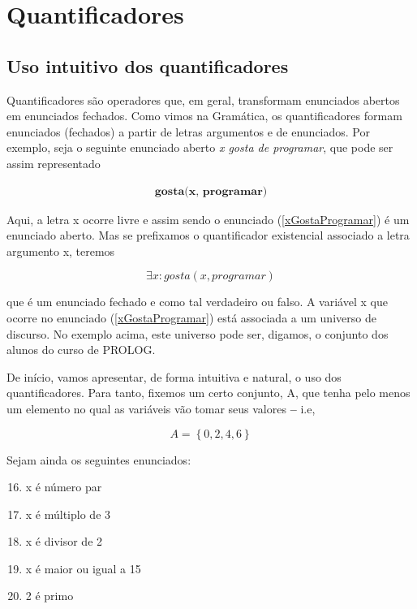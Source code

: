 \chapter{Quantificadores}

\setcounter{exemplo}{0}

\section{Uso intuitivo dos quantificadores}

Quantificadores são operadores que, em geral, transformam enunciados abertos em enunciados fechados.
Como vimos na Gramática, os quantificadores formam enunciados (fechados) a partir de letras argumentos e de enunciados.
Por exemplo, seja o seguinte enunciado aberto \textit{x gosta de programar}, que pode ser assim representado

\begin{align*}
    \textbf{gosta(x, programar)} \tag{1} \label{xGostaProgramar}
\end{align*}

Aqui, a letra x ocorre livre e assim sendo o enunciado (\ref{xGostaProgramar}) é um enunciado aberto.
Mas se prefixamos o quantificador existencial associado a letra argumento x, teremos

$$\exists x \colon gosta(x, programar)$$

\noindent que é um enunciado fechado e como tal verdadeiro ou falso.
A variável x que ocorre no enunciado (\ref{xGostaProgramar}) está associada a um universo de discurso.
No exemplo acima, este universo pode ser, digamos, o conjunto dos alunos do curso de PROLOG.

De início, vamos apresentar, de forma intuitiva e natural, o uso dos quantificadores.
Para tanto, fixemos um certo conjunto, A, que tenha pelo menos um elemento no qual as variáveis vão tomar seus valores \textbf{--} i.e,

$$A = \left\{ 0, 2, 4, 6\right\}$$

\noindent Sejam ainda os seguintes enunciados:
\begin{enumerate}[label=\textbf{\alph*(x)} $\colon$]
    \setcounter{enumi}{15}
    \item x é número par
    \item x é múltiplo de 3
    \item x é divisor de 2
    \item x é maior ou igual a 15
    \item 2 é primo
\end{enumerate}

